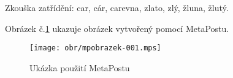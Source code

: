 \documentclass[12pt]{article}
\begin{document}
Zkouška zatřídění: car, cár, carevna,
                      zlato, zlý, žluna,
                      žlutý.
                      
Obrázek č.\ref{obr.MetaPost}  ukazuje obrázek vytvořený pomocí MetaPostu. 

\begin{figure}[hbt]
    \centering
    \texttt{[image: obr/mpobrazek-001.mps]}
    \caption{Ukázka použití MetaPostu}
    \label{obr.MetaPost}


\end{figure}

\printindex

\printbibliography[title = {Seznam bibliografických citací}] 
\end{document}
